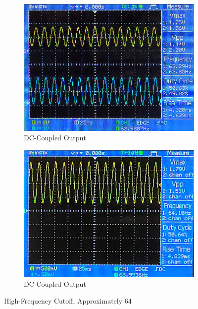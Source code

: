 \documentclass[hidelinks,12pt]{article}
\begin{document}
	\begin{figure}[!h]
		\centering
		\begin{subfigure}{0.45\textwidth}
			\centering
			\includegraphics[width=\linewidth]{figures/results/64hz_double}
			\caption{DC-Coupled Output}
		\end{subfigure}
		\hfill
		\begin{subfigure}{0.45\textwidth}
			\centering
			\includegraphics[width=\linewidth]{figures/results/64hz_output_dc}
			\caption{DC-Coupled Output}
		\end{subfigure}
		\caption{High-Frequency Cutoff, Approximately 64\,}
	\end{figure}
	
	\pagebreak
	
\end{document}
